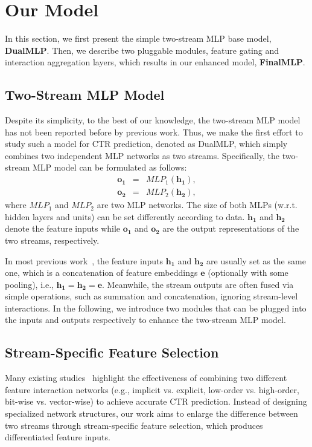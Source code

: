 \documentclass[letterpaper]{article} \usepackage{aaai23}  \usepackage{times}  \usepackage{helvet}  \usepackage{courier}  \usepackage[hyphens]{url}  \usepackage{graphicx} \urlstyle{rm} \def\UrlFont{\rm}  \usepackage{natbib}  \usepackage{caption} \frenchspacing  \setlength{\pdfpagewidth}{8.5in}  \setlength{\pdfpageheight}{11in}  \usepackage{algorithm}
\begin{document}
 \section{Our Model}

In this section, we first present the simple two-stream MLP base model, \textbf{DualMLP}. Then, we describe two pluggable modules, feature gating and interaction aggregation layers, which results in our enhanced model, \textbf{FinalMLP}.




\subsection{Two-Stream MLP Model}
Despite its simplicity, to the best of our knowledge, the two-stream MLP model  has not been reported before by previous work. Thus, we make the first effort to study such a model for CTR prediction, denoted as DualMLP, which simply combines two independent MLP networks as two streams. Specifically, the two-stream MLP model can be formulated as follows:
\begin{eqnarray}
\mathbf{o_1} &=& {MLP}_1(\mathbf{h_1}), \\
\mathbf{o_2} &=& {MLP}_2(\mathbf{h_2}),
\end{eqnarray}
where ${MLP}_1$ and ${MLP}_2$ are two MLP networks. The size of both MLPs (w.r.t. hidden layers and units) can be set differently according to data. $\mathbf{h_1}$ and $\mathbf{h_2}$ denote the feature inputs while $\mathbf{o_1}$ and $\mathbf{o_2}$ are the output representations of the two streams, respectively. 

In most previous work~\cite{DCN,DeepFM,AFN}, the feature inputs $\mathbf{h_1}$ and $\mathbf{h_2}$ are usually set as the same one, which is a concatenation of feature embeddings $\mathbf{e}$ (optionally with some pooling), i.e., $\mathbf{h_1}=\mathbf{h_2}=\mathbf{e}$. Meanwhile, the stream outputs are often fused via simple operations, such as summation and concatenation, ignoring stream-level interactions. In the following, we introduce two modules that can be plugged into the inputs and outputs respectively to enhance the two-stream MLP model. 


\subsection{Stream-Specific Feature Selection}
\label{sec:input_differentiation}
Many existing studies~\cite{DeepFM,xDeepFM,DCN,autoint}
highlight the effectiveness of combining two different feature interaction networks (e.g., implicit vs. explicit, low-order vs. high-order, bit-wise vs. vector-wise) to achieve accurate CTR prediction. Instead of designing specialized network structures, our work aims to enlarge the difference between two streams through stream-specific feature selection, which produces differentiated feature inputs. 
\end{document}
